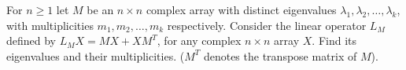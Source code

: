 For $n\geq 1$ let $M$ be an $n\times n$ complex array with distinct eigenvalues $\lambda_1,\lambda_2,\ldots,\lambda_k$, with multiplicities $m_1,m_2,\ldots,m_k$ respectively. Consider the linear operator $L_M$ defined by $L_MX=MX+XM^T$, for any complex $n\times n$ array $X$. Find its eigenvalues and their multiplicities. ($M^T$ denotes the transpose matrix of $M$).
